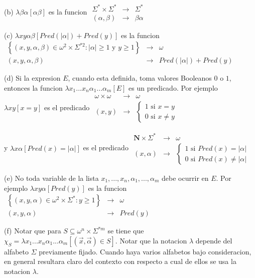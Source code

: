(b) \(\lambda \beta \alpha \left[ \alpha \beta \right] \) es la funcion
\(\displaystyle \begin{array}{rll} \Sigma ^{\ast }\times \Sigma ^{\ast } & \rightarrow & \Sigma ^{\ast } \\ (\alpha ,\beta ) & \rightarrow & \beta \alpha \end{array} \)

(c) \(\lambda xy\alpha \beta \left[ Pred(\left\vert \alpha \right\vert )+Pred(y)\right] \) es la funcion
\(\displaystyle \begin{array}{rll} \left\{ (x,y,\alpha ,\beta )\in \omega ^{2}\times \Sigma ^{\ast 2}:\left\vert \alpha \right\vert \geq 1\text{ y }y\geq 1\right\} & \rightarrow & \omega \\ (x,y,\alpha ,\beta ) & \rightarrow & Pred(\left\vert \alpha \right\vert )+Pred(y) \end{array} \)

(d) Si la expresion \(E\), cuando esta definida, toma valores Booleanos \(0\) o \(1\), entonces la funcion \(\lambda x_{1}...x_{n}\alpha _{1}...\alpha _{m}\left[ E\right] \) es un predicado. Por ejemplo \(\lambda xy\left[ x=y \right] \) es el predicado
\(\displaystyle \begin{array}{rll} \omega \times \omega & \rightarrow & \omega \\ (x,y) & \rightarrow & \left\{ \begin{array}{l} 1\text{ si }x=y \\ 0\text{ si }x\neq y \end{array} \right. \end{array} \)

y \(\lambda x\alpha \left[ Pred(x)=\left\vert \alpha \right\vert \right] \) es el predicado
\(\displaystyle \begin{array}{rll} \mathbf{N}\times \Sigma ^{\ast } & \rightarrow & \omega \\ (x,\alpha ) & \rightarrow & \left\{ \begin{array}{l} 1\text{ si }Pred(x)=\left\vert \alpha \right\vert \\ 0\text{ si }Pred(x)\neq \left\vert \alpha \right\vert \end{array} \right. \end{array} \)

(e) No toda variable de la lista \(x_{1},...,x_{n},\alpha _{1},...,\alpha _{m}\) debe ocurrir en \(E.\) Por ejemplo \(\lambda xy\alpha \left[ Pred(y)\right] \) es la funcion
\(\displaystyle \begin{array}{rll} \left\{ (x,y,\alpha )\in \omega ^{2}\times \Sigma ^{\ast }:y\geq 1\right\} & \rightarrow & \omega \\ (x,y,\alpha ) & \rightarrow & Pred(y) \end{array} \)

(f) Notar que para \(S\subseteq \omega ^{n}\times \Sigma ^{\ast m}\) se tiene que \(\chi _{S}=\lambda x_{1}...x_{n}\alpha _{1}...\alpha _{m}\left[ ( \vec{x},\vec{\alpha})\in S\right] .\)
Notar que la notacion \(\lambda \) depende del alfabeto \(\Sigma \) previamente fijado. Cuando haya varios alfabetos bajo consideracion, en general resultara claro del contexto con respecto a cual de ellos se usa la notacion \(\lambda \).
